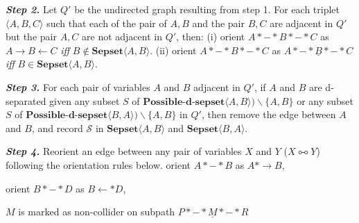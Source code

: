 \documentclass[11pt]{article}
\theoremstyle{definition}
\begin{document}
\begin{appendices}
\begin{algorithm}
\begin{algorithmic}[1]
\State \textit{\textbf{Step 2.}} \label{fcistep2} Let $Q'$ be the undirected graph resulting from step 1. For each triplet $\langle A, B, C \rangle$ such that each of the pair of $A, B$ and the pair $B, C$ are adjacent in $Q'$ but the pair $A, C$ are not adjacent in $Q'$, then:
    \State (i) orient $A *-*B*-*C$ as $A \rightarrow B \leftarrow C$ \textit{iff} $B \notin \mathbf{Sepset}\langle A, B \rangle$.
    \State (ii) orient $A *-*B*-*C$ as $A *-* \underline{B}*-*C$ \textit{iff} $B \in \mathbf{Sepset}\langle A, B \rangle$.

\end{algorithmic}
\end{algorithm}


\begin{algorithm}                     
\begin{algorithmic}[1]     

    
\State \textit{\textbf{Step 3.}} \label{fcistep3} For each pair of variables $A$ and $B$ adjacent in $Q'$, if $A$ and $B$ are d-separated given any subset $S$ of $\textbf{Possible-d-sepset} \langle A, B \rangle) \backslash \{A, B\}$ or any subset $S$ of $\textbf{Possible-d-sepset} \langle B, A \rangle) \backslash \{A, B\}$ in $Q'$, then remove the edge between $A$ and $B$, and record $\mathcal{S}$ in $\mathbf{Sepset} \langle A, B \rangle$ and $\mathbf{Sepset}\langle B, A \rangle$.

\State \textit{\textbf{Step 4.}}  \label{fcistep4} Reorient an edge between any pair of variables $X$ and $Y$ ($X \multimapboth Y$) following the orientation rules below. 
\Repeat
            \State orient $A * - * B$ as $A * \rightarrow B$,
        
            \State orient $B*-*D$ as $B \leftarrow * D$,
        
                 {$M$ is marked as non-collider on subpath $P *-* \underline{M} *-* R$}
                \EndIf
        

\end{algorithmic}
\end{algorithm}
\end{appendices}
\end{document}
